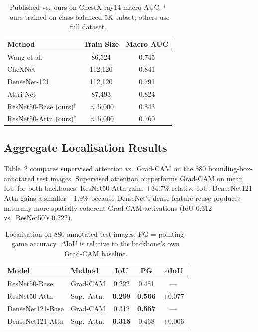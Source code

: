\documentclass[10pt,twocolumn,letterpaper]{article}
\newcommand{\dagmark}{$^{\dagger}$}
\begin{document}
\begin{table}[t]
\centering
\caption{Published vs.\ ours on ChestX-ray14 macro AUC.
  \dagmark{}~ours trained on class-balanced 5K subset; others use full dataset.}
\label{tab:sota}
\setlength{\tabcolsep}{4pt}
{\small
\begin{tabular}{lcc}
\toprule
\textbf{Method} & \textbf{Train Size} & \textbf{Macro AUC}\\
\midrule
Wang et al.\ \citeyear{wang2017chestxray}   & 86,524  & 0.745\\
CheXNet \citeyear{chexnet2017}              & 112,120 & 0.841\\
DenseNet-121 \citeyear{holste2022}          & 112,120 & 0.791\\
Attri-Net \citeyear{attrinet2023}           & 87,493  & 0.824\\
\midrule
ResNet50-Base (ours)\dagmark               & $\approx$5,000 & 0.843\\
ResNet50-Attn (ours)\dagmark               & $\approx$5,000 & 0.760\\
\bottomrule
\end{tabular}}
\end{table}

\subsection{Aggregate Localisation Results}

Table~\ref{tab:localisation} compares supervised attention vs.\ Grad-CAM on the 880
bounding-box-annotated test images. Supervised attention outperforms Grad-CAM on mean
IoU for both backbones. ResNet50-Attn gains $+34.7\%$ relative IoU. DenseNet121-Attn
gains a smaller $+1.9\%$ because DenseNet's dense feature reuse produces naturally
more spatially coherent Grad-CAM activations (IoU 0.312 vs.\ ResNet50's 0.222).

\begin{table}[t]
\centering
\caption{Localisation on 880 annotated test images. PG = pointing-game accuracy.
  $\Delta$IoU is relative to the backbone's own Grad-CAM baseline.}
\label{tab:localisation}
\setlength{\tabcolsep}{3.5pt}
{\small
\begin{tabular}{llccc}
\toprule
\textbf{Model} & \textbf{Method} & \textbf{IoU} & \textbf{PG} & \textbf{$\Delta$IoU}\\
\midrule
ResNet50-Base    & Grad-CAM    & 0.222 & 0.481 & ---\\
ResNet50-Attn    & Sup.\ Attn. & \textbf{0.299} & \textbf{0.506} & $+0.077$\\
\midrule
DenseNet121-Base & Grad-CAM    & 0.312 & \textbf{0.557} & ---\\
DenseNet121-Attn & Sup.\ Attn. & \textbf{0.318} & 0.468 & $+0.006$\\
\bottomrule
\end{tabular}}
\end{table}
\end{document}
